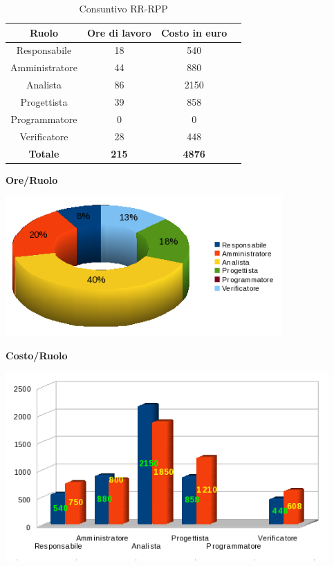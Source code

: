 \begin{table}[h]
	\begin{center}
		  \begin{tabular}{|c|c|c|c|}
		 \hline 
		 \textbf{Ruolo} & \textbf{Ore di lavoro} & \textbf{Costo in euro}\\
		 \hline
		Responsabile & 18 & 540 \\
		Amministratore & 44 & 880\\
		Analista & 86 & 2150\\
		Progettista & 39 & 858\\
		Programmatore & 0 & 0 \\
		Verificatore & 28 & 448\\
        \hline
        \textbf{Totale} & \textbf{215} & \textbf{4876}\\
		\hline
		\end{tabular}
	\caption{Consuntivo RR-RPP} 
	\label{tab:cons_RR-RPP}
	\end{center}	
\end{table}

\begin{center}\textbf{Ore/Ruolo}
\end{center}
\includegraphics[width=300pt]{Cons-RR-RPP2}
\newpage

\begin{center}\textbf{Costo/Ruolo}
\end{center}
\includegraphics[width=350pt]{Cons-RR-RPP1}


